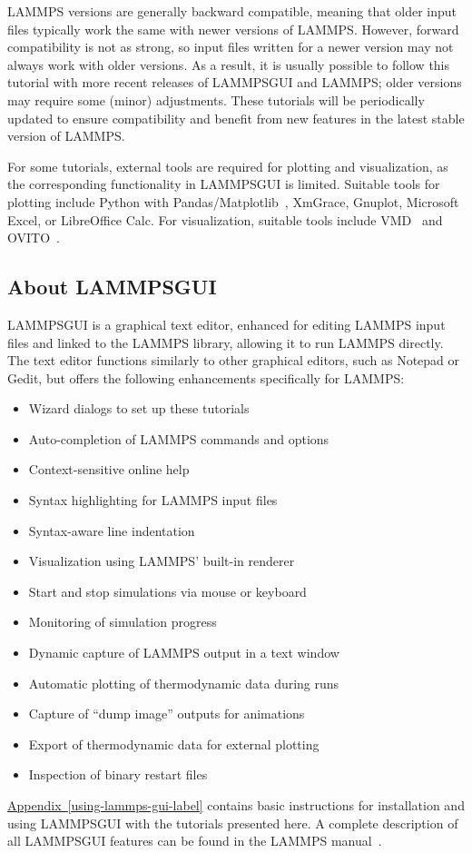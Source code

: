 \documentclass[9pt,tutorial]{livecoms}
\newcommand{\lammpsgui}{\textsf{LAMMPS\textendash GUI}}
\begin{document}
LAMMPS versions are generally backward compatible, meaning that older
input files typically work the same with newer versions of LAMMPS.
However, forward compatibility is not as strong, so input files written
for a newer version may not always work with older versions.  As a
result, it is usually possible to follow this tutorial with more recent
releases of \lammpsgui{} and LAMMPS; older versions may require some
(minor) adjustments.  These tutorials will be periodically updated to
ensure compatibility and benefit from new features in the latest stable
version of LAMMPS.

For some tutorials, external tools are required for plotting and
visualization, as the corresponding functionality in \lammpsgui{} is
limited.  Suitable tools for plotting include Python with
Pandas/Matplotlib~\cite{van1995python,hunter2007Matplotlib}, XmGrace,
Gnuplot, Microsoft Excel, or LibreOffice Calc.  For visualization,
suitable tools include VMD~\cite{vmd_home,humphrey1996vmd} and
OVITO~\cite{ovito_home,stukowski2009visualization}.

\subsection{About \lammpsgui{}}

\lammpsgui{} is a graphical text editor, enhanced for editing LAMMPS
input files and linked to the LAMMPS library, allowing it to run LAMMPS
directly.  The text editor functions similarly to other graphical
editors, such as Notepad or Gedit, but offers the following enhancements
specifically for LAMMPS:
\begin{itemize}
  \item Wizard dialogs to set up these tutorials
  \item Auto-completion of LAMMPS commands and options
  \item Context-sensitive online help
  \item Syntax highlighting for LAMMPS input files
  \item Syntax-aware line indentation
  \item Visualization using LAMMPS' built-in renderer
  \item Start and stop simulations via mouse or keyboard
  \item Monitoring of simulation progress
  \item Dynamic capture of LAMMPS output in a text window
  \item Automatic plotting of thermodynamic data during runs
  \item Capture of ``dump image'' outputs for animations
  \item Export of thermodynamic data for external plotting
  \item Inspection of binary restart files
\end{itemize}
\hyperref[using-lammps-gui-label]{Appendix~\ref{using-lammps-gui-label}}
contains basic instructions for installation and using \lammpsgui{} with
the tutorials presented here.  A complete description of all \lammpsgui{}
features can be found in the LAMMPS manual~\cite{lammps_gui_docs}.
\end{document}
